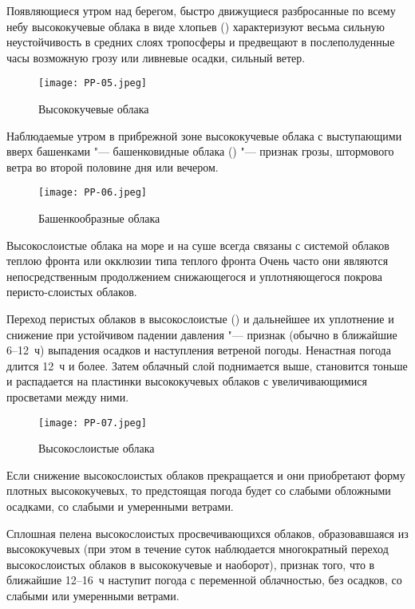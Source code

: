  Появляющиеся утром над берегом, быстро движущиеся разбросанные по
всему небу высококучевые облака в виде хлопьев () характеризуют
весьма сильную неустойчивость в средних слоях тропосферы и предвещают
в послеполуденные часы возможную грозу или ливневые осадки, сильный
ветер.

\begin{figure}[htb]
  \centering{}
  \texttt{[image: PP-05.jpeg]}
  \caption{Высококучевые облака}
  \label{fig:pp05}
  \small
  \centering{}
\end{figure}

 Наблюдаемые утром в прибрежной зоне высококучевые облака с
выступающими вверх башенками "--- башенковидные облака () "--- признак
грозы, штормового ветра во второй половине дня или вечером.

\begin{figure}[htb]
  \centering{}
  \texttt{[image: PP-06.jpeg]}
  \caption{Башенкообразные облака}
  \label{fig:pp06}
  \small
  \centering{}
\end{figure}

Высокослоистые облака на море и на суше всегда связаны с системой
облаков теплою фронта или окклюзии типа теплого фронта Очень часто они
являются непосредственным продолжением снижающегося и уплотняющегося
покрова перисто-слоистых облаков.

 Переход перистых облаков в высокослоистые () и
дальнейшее их уплотнение и снижение при устойчивом падении
давления "--- признак (обычно в ближайшие 6--12~ч) выпадения
осадков и наступления ветреной погоды. Ненастная погода длится 12~ч и
более. Затем облачный слой поднимается выше, становится тоньше и
распадается на пластинки высококучевых облаков с увеличивающимися
просветами между ними.

\begin{figure}[htb]
  \centering{}
  \texttt{[image: PP-07.jpeg]}
  \caption{Высокослоистые облака}
  \label{fig:pp07}
  \small
  \centering{}
\end{figure}

 Если снижение высокослоистых облаков прекращается и они
приобретают форму плотных высококучевых, то предстоящая погода будет
со слабыми обложными осадками, со слабыми и умеренными ветрами.

 Сплошная пелена высокослоистых просвечивающихся облаков,
образовавшаяся из высококучевых (при этом в течение суток наблюдается
многократный переход высокослоистых облаков в высококучевые и
наоборот), признак того, что в ближайшие 12--16~ч наступит погода
с переменной облачностью, без осадков, со слабыми или умеренными
ветрами.

